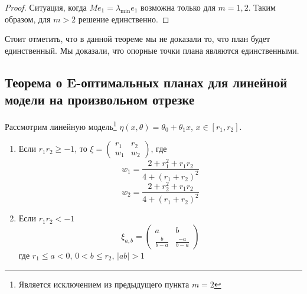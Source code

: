 \begin{proof}
Ситуация, когда $Me_1 = \lambda_{\min} e_1$ возможна только для $m=1,2$. Таким образом, для $m > 2$ решение единственно. 
\end{proof}


  \begin{note}
  Стоит отметить, что в данной теореме мы не доказали то, что план будет единственный. Мы доказали, что опорные точки плана являются единственными. 
 \end{note}

\subsection{Теорема о E-оптимальных планах для линейной модели на произвольном отрезке}
Рассмотрим линейную модель\footnote{Является исключением из предыдущего пункта $m=2$} $\eta(x, \theta) = \theta_0 + \theta_1 x$, $x \in [r_1,r_2]$. 
\begin{thm}
\begin{enumerate}
\item Если $r_1r_2 \geq -1$, то $\xi = \begin{pmatrix} r_1 & r_2 \\ w_1 & w_2\end{pmatrix}$, где 
$$w_1 = \frac{2+r_1^2 + r_1r_2}{4+(r_1+r_2)^2}$$
$$ w_2 = \frac{2+r_2^2 + r_1r_2}{4+(r_1+r_2)^2}$$ 
\item Если $r_1r_2 < -1$
$$\xi_{a,b} = \begin{pmatrix} a & b \\ \frac{b}{b-a} & \frac{-a}{b-a} \end{pmatrix}$$
где $r_1 \leq a < 0$, $0 < b \leq r_2$, $|ab|> 1$
\end{enumerate}
\end{thm}
